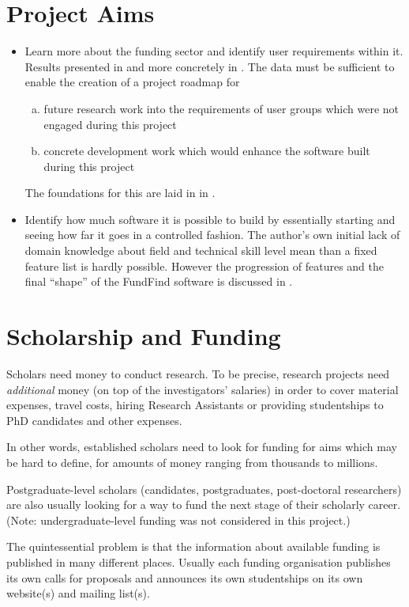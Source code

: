 \section{Project Aims}
\begin{itemize}
 \item Learn more about the funding sector and identify user requirements within it. Results presented in  and more concretely in . The data must be sufficient to enable the creation of a project roadmap for
    \begin{enumerate}[a)]
    \item future research work into the requirements of user groups which were not engaged during this project
    \item concrete development work which would enhance the software built during this project
    \end{enumerate}
  The foundations for this are laid in in .
  
 \item Identify how much software it is possible to build by essentially starting and seeing how far it goes in a controlled fashion. The author's own initial lack of domain knowledge about field and technical skill level mean than a fixed feature list is hardly possible. However the progression of features and the final ``shape'' of the FundFind software is discussed in .
\end{itemize}

\section{Scholarship and Funding}
Scholars need money to conduct research. To be precise, research projects need \emph{additional} money (on top of the investigators' salaries) in order to cover material expenses, travel costs, hiring Research Assistants or providing studentships to PhD candidates and other expenses. 

In other words, established scholars need to look for funding for aims which may be hard to define, for amounts of money ranging from thousands to millions.

Postgraduate-level scholars (candidates, postgraduates, post-doctoral researchers) are also usually looking for a way to fund the next stage of their scholarly career. (Note: undergraduate-level funding was not considered in this project.)

The quintessential problem is that the information about available funding is published in many different places. Usually each funding organisation publishes its own calls for proposals and announces its own studentships on its own website(s) and mailing list(s).

